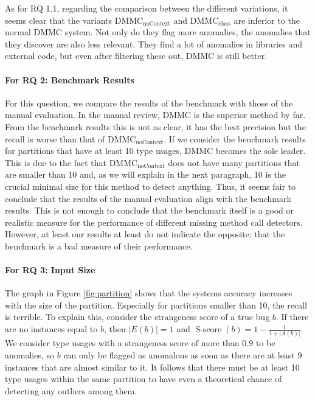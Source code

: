 As for RQ 1.1, regarding the comparison between the different variations, it seems clear that the variants $\text{DMMC}_\text{noContext}$ and $\text{DMMC}_\text{class}$ are inferior to the normal $\text{DMMC}$ system.
Not only do they flag more anomalies, the anomalies that they discover are also less relevant.
They find a lot of anomalies in libraries and external code, but even after filtering these out, $\text{DMMC}$ is still better.

\paragraph{For RQ 2: Benchmark Results}

For this question, we compare the results of the benchmark with those of the manual evaluation.
In the manual review, $\text{DMMC}$ is the superior method by far.
From the benchmark results this is not as clear, it has the best precision but the recall is worse than that of $\text{DMMC}_\text{noContext}$.
If we consider the benchmark results for partitions that have at least 10 type usages, $\text{DMMC}$ becomes the sole leader.
This is due to the fact that $\text{DMMC}_\text{noContext}$ does not have many partitions that are smaller than 10 and, as we will explain in the next paragraph, 10 is the crucial minimal size for this method to detect anything.
Thus, it seems fair to conclude that the results of the manual evaluation align with the benchmark results.
This is not enough to conclude that the benchmark itself is a good or realistic measure for the performance of different missing method call detectors.
However, at least our results at least do not indicate the opposite: that the benchmark is a bad measure of their performance.

\paragraph{For RQ 3: Input Size}

The graph in Figure \ref{fig:partition} shows that the systems accuracy increases with the size of the partition.
Especially for partitions smaller than 10, the recall is terrible.
To explain this, consider the strangeness score of a true bug $b$.
If there are no instances equal to $b$, then $|E(b)|=1$ and $\operatorname{S-score}(b)=1-\frac{1}{1+|A(b)|}$.
We consider type usages with a strangeness score of more than $0.9$ to be anomalies, so $b$ can only be flagged as anomalous as soon as there are at least $9$ instances that are almost similar to it.
It follows that there must be at least 10 type usages within the same partition to have even a theoretical chance of detecting any outliers among them.

